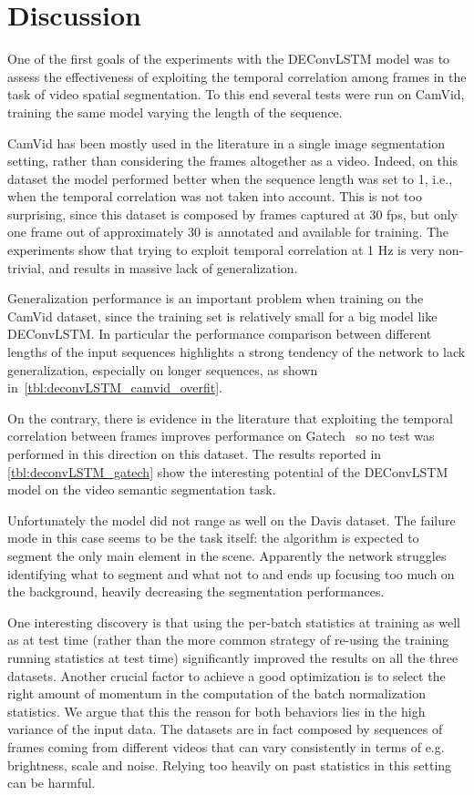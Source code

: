 \section{Discussion}\label{sec:deconvLSTM_discussion}
One of the first goals of the experiments with the DEConvLSTM model was to
assess the effectiveness of exploiting the temporal correlation among frames in
the task of video spatial segmentation. To this end several tests were run on
CamVid, training the same model varying the length of the sequence.

CamVid has been mostly used in the literature in a single image
segmentation setting, rather than considering the frames altogether as a video.
Indeed, on this dataset the model performed better when the sequence length was
set to 1, i.e., when the temporal correlation was not taken into account.
This is not too surprising, since this dataset is composed by frames captured
at 30 fps, but only one frame out of approximately 30 is annotated and available
for training. The experiments show that trying to exploit temporal correlation
at 1 Hz is very non-trivial, and results in massive lack of generalization.

Generalization performance is an important problem when training on the CamVid
dataset, since the training set is relatively small for a big model like
DEConvLSTM. In particular the performance comparison between different lengths
of the input sequences highlights a strong tendency of the network to lack
generalization, especially on longer sequences, as shown
in~\autoref{tbl:deconvLSTM_camvid_overfit}. %

On the contrary, there is evidence in the literature that exploiting the
temporal correlation between frames improves performance on Gatech~\cite{
Tran16v2v} so no test was performed in this direction on this dataset. The
results reported in \autoref{tbl:deconvLSTM_gatech} show the interesting
potential of the DEConvLSTM model on the video semantic segmentation task.

Unfortunately the model did not range as well on the Davis dataset. The failure
mode in this case seems to be the task itself: the algorithm is expected to
segment the only main element in the scene. Apparently the network struggles
identifying what to segment and what not to and ends up focusing too much on
the background, heavily decreasing the segmentation performances.

One interesting discovery is that using the per-batch statistics at training as
well as at test time (rather than the more common strategy of re-using the
training running statistics at test time) significantly improved the results on
all the three datasets. Another crucial factor to achieve a good optimization
is to select the right amount of momentum in the computation of the batch
normalization statistics. We argue that this the reason for both behaviors lies
in the high variance of the input data. The datasets are in fact composed by
sequences of frames coming from different videos that can vary consistently in
terms of e.g. brightness, scale and noise. Relying too heavily on past
statistics in this setting can be harmful.

